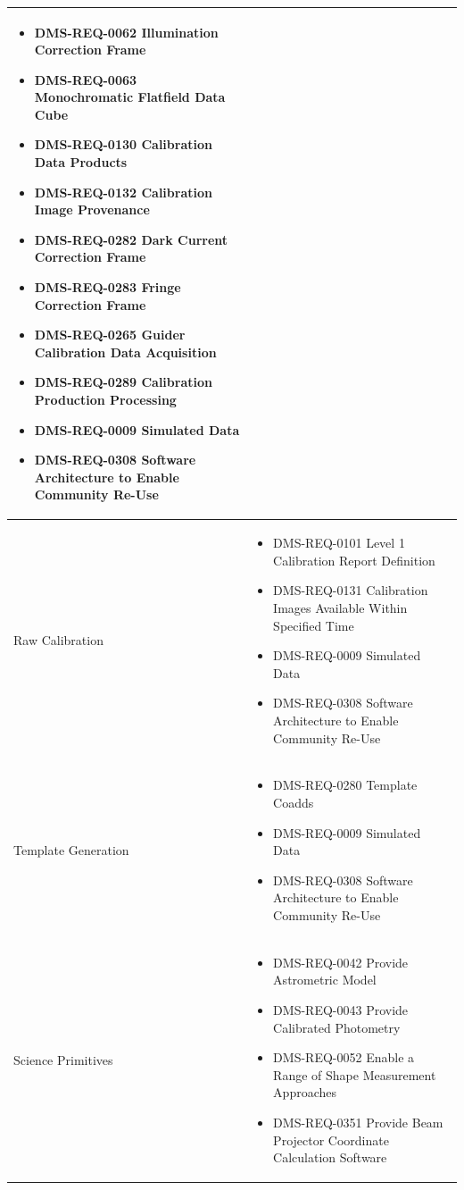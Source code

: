 \documentclass[DM,lsstdraft,toc]{lsstdoc}
\begin{document}
\begin{xtabular}{|p{0.1\textwidth}|p{0.85\textwidth}|}
\begin{itemize}
\item DMS-REQ-0062 Illumination Correction Frame
\item DMS-REQ-0063 Monochromatic Flatfield Data Cube
\item DMS-REQ-0130 Calibration Data Products
\item DMS-REQ-0132 Calibration Image Provenance
\item DMS-REQ-0282 Dark Current Correction Frame
\item DMS-REQ-0283 Fringe Correction Frame
\item DMS-REQ-0265 Guider Calibration Data Acquisition
\item DMS-REQ-0289 Calibration Production Processing
\item DMS-REQ-0009 Simulated Data
\item DMS-REQ-0308 Software Architecture to Enable Community Re-Use \end{itemize} \\ \hline
Raw Calibration &
\begin{itemize} \item DMS-REQ-0101 Level 1 Calibration Report Definition
\item DMS-REQ-0131 Calibration Images Available Within Specified Time
\item DMS-REQ-0009 Simulated Data
\item DMS-REQ-0308 Software Architecture to Enable Community Re-Use \end{itemize} \\ \hline
Template Generation &
\begin{itemize} \item DMS-REQ-0280 Template Coadds
\item DMS-REQ-0009 Simulated Data
\item DMS-REQ-0308 Software Architecture to Enable Community Re-Use \end{itemize} \\ \hline
Science Primitives &
\begin{itemize} \item DMS-REQ-0042 Provide Astrometric Model
\item DMS-REQ-0043 Provide Calibrated Photometry
\item DMS-REQ-0052 Enable a Range of Shape Measurement Approaches
\item DMS-REQ-0351 Provide Beam Projector Coordinate Calculation Software \end{itemize} \\ \hline
\end{xtabular}


\end{document}
